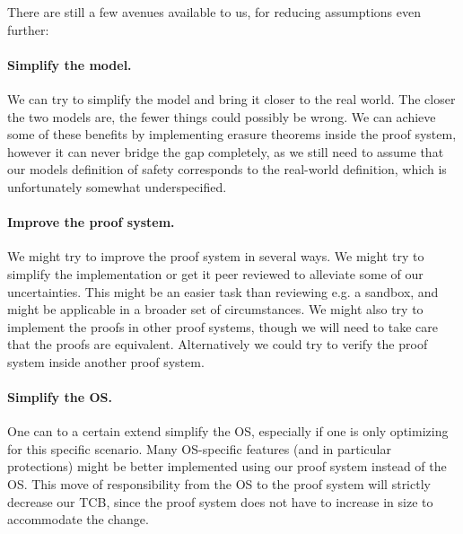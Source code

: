 There are still a few avenues available to us, for reducing assumptions even
further:

\paragraph{Simplify the model.} We can try to simplify the model and bring it
closer to the real world. The closer the two models are, the fewer things could
possibly be wrong. We can achieve some of these benefits by implementing erasure
theorems inside the proof system, however it can never bridge the gap
completely, as we still need to assume that our models definition of safety
corresponds to the real-world definition, which is unfortunately somewhat
underspecified.

\paragraph{Improve the proof system.} We might try to improve the proof system
in several ways. We might try to simplify the implementation or get it peer
reviewed to alleviate some of our uncertainties. This might be an easier task
than reviewing e.g. a sandbox, and might be applicable in a broader set of
circumstances. We might also try to implement the proofs in other proof systems,
though we will need to take care that the proofs are equivalent. Alternatively
we could try to verify the proof system inside another proof system.

\paragraph{Simplify the OS.} One can to a certain extend simplify the OS,
especially if one is only optimizing for this specific scenario. Many
OS-specific features (and in particular protections) might be better implemented
using our proof system instead of the OS. This move of responsibility from the
OS to the proof system will strictly decrease our TCB, since the proof system
does not have to increase in size to accommodate the change.

